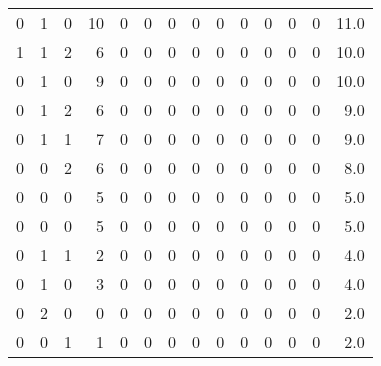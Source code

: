 \begin{tabular}{rrrrrrrrrrrrrr}
       0 &       1 &          0 &              10 &                0 &       0 &          0 &          0 &         0 &         0 &      0 &             0 &         0 &     11.0 \\
       1 &       1 &          2 &               6 &                0 &       0 &          0 &          0 &         0 &         0 &      0 &             0 &         0 &     10.0 \\
       0 &       1 &          0 &               9 &                0 &       0 &          0 &          0 &         0 &         0 &      0 &             0 &         0 &     10.0 \\
       0 &       1 &          2 &               6 &                0 &       0 &          0 &          0 &         0 &         0 &      0 &             0 &         0 &      9.0 \\
       0 &       1 &          1 &               7 &                0 &       0 &          0 &          0 &         0 &         0 &      0 &             0 &         0 &      9.0 \\
       0 &       0 &          2 &               6 &                0 &       0 &          0 &          0 &         0 &         0 &      0 &             0 &         0 &      8.0 \\
       0 &       0 &          0 &               5 &                0 &       0 &          0 &          0 &         0 &         0 &      0 &             0 &         0 &      5.0 \\
       0 &       0 &          0 &               5 &                0 &       0 &          0 &          0 &         0 &         0 &      0 &             0 &         0 &      5.0 \\
       0 &       1 &          1 &               2 &                0 &       0 &          0 &          0 &         0 &         0 &      0 &             0 &         0 &      4.0 \\
       0 &       1 &          0 &               3 &                0 &       0 &          0 &          0 &         0 &         0 &      0 &             0 &         0 &      4.0 \\
       0 &       2 &          0 &               0 &                0 &       0 &          0 &          0 &         0 &         0 &      0 &             0 &         0 &      2.0 \\
       0 &       0 &          1 &               1 &                0 &       0 &          0 &          0 &         0 &         0 &      0 &             0 &         0 &      2.0 \\

\end{tabular}
